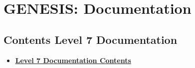 \documentclass[12pt]{article}
\begin{document}
\section*{GENESIS: Documentation}

\subsection*{Contents Level 7 Documentation}

\begin{itemize}

\item \href{../contents-level7/contents-level7.pdf}{\bf \underline{Level 7 Documentation Contents}}


\end{itemize}

\end{document}
